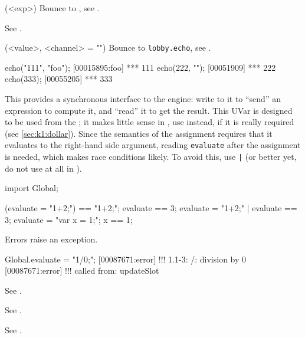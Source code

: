 \begin{urbiscriptapi}
\item[disown](<exp>)%
  Bounce to , see .


\item[Duration] See .


\item[echo](<value>, <channel> = "")%
  Bounce to \lstinline|lobby.echo|, see .
\begin{urbiscript}
echo("111", "foo");
[00015895:foo] *** 111
echo(222, "");
[00051909] *** 222
echo(333);
[00055205] *** 333
\end{urbiscript}


\item[evaluate] This  provides a synchronous interface to
  the \urbi engine: write to it to ``send'' an expression to compute it, and
  ``read'' it to get the result.  This UVar is designed to be used from the
  \Cxx; it makes little sense in \us, use  instead, if
  it is really required (see \autoref{sec:k1:dollar}).  Since the semantics
  of the assignment requires that it evaluates to the right-hand side
  argument, reading \lstinline|evaluate| after the assignment is needed,
  which makes race conditions likely.  To avoid this, use \lstinline{|} (or
  better yet, do not use  at all in \us).

\begin{urbiscript}
import Global;
\end{urbiscript}

\begin{urbiassert}
(evaluate = "1+2;") == "1+2;";
 evaluate == 3;
{ evaluate = "1+2;" | evaluate } == 3;
{ evaluate = "var x = 1;"; x } == 1;
\end{urbiassert}

  Errors raise an exception.

\begin{urbiscript}
Global.evaluate = "1/0;";
[00087671:error] !!! 1.1-3: /: division by 0
[00087671:error] !!!    called from: updateSlot
\end{urbiscript}


\item[Event] See .


\item[Exception] See .


\item[Executable] See .



\end{urbiscriptapi}
